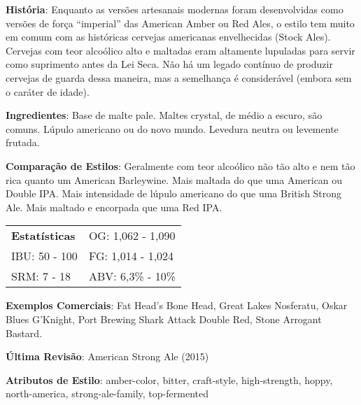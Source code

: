 \textbf{História}: Enquanto as versões artesanais modernas foram desenvolvidas como versões de força “imperial” das American Amber ou Red Ales, o estilo tem muito em comum com as históricas cervejas americanas envelhecidas (Stock Ales). Cervejas com teor alcoólico alto e maltadas eram altamente lupuladas para servir como suprimento antes da Lei Seca. Não há um legado contínuo de produzir cervejas de guarda dessa maneira, mas a semelhança é considerável (embora sem o caráter de idade).

\textbf{Ingredientes}: Base de malte pale. Maltes crystal, de médio a escuro, são comuns. Lúpulo americano ou do novo mundo. Levedura neutra ou levemente frutada.

\textbf{Comparação de Estilos}: Geralmente com teor alcoólico não tão alto e nem tão rica quanto um American Barleywine. Mais maltada do que uma American ou Double IPA. Mais intensidade de lúpulo americano do que uma British Strong Ale. Mais maltado e encorpada que uma Red IPA.

\begin{tabular}{@{}p{35mm}p{35mm}@{}}
  \textbf{Estatísticas} & OG: 1,062 - 1,090  \\
  IBU: 50 - 100  & FG: 1,014 - 1,024   \\
  SRM: 7 - 18 & ABV: 6,3\% - 10\%
\end{tabular}

\textbf{Exemplos Comerciais}: Fat Head's Bone Head, Great Lakes Nosferatu, Oskar Blues G'Knight, Port Brewing Shark Attack Double Red, Stone Arrogant Bastard.

\textbf{Última Revisão}: American Strong Ale (2015)

\textbf{Atributos de Estilo}: amber-color, bitter, craft-style, high-strength, hoppy, north-america, strong-ale-family, top-fermented
